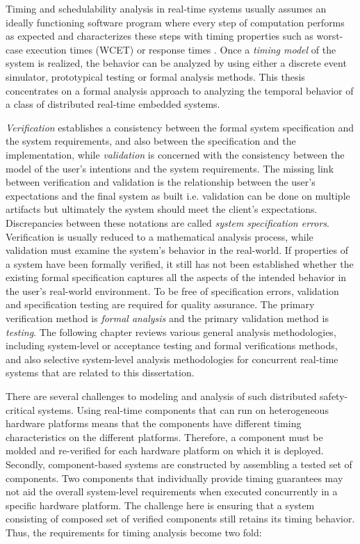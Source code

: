 Timing and schedulability analysis in real-time systems usually assumes an ideally functioning software program where every step of computation performs as expected and characterizes these steps with timing properties such as worst-case execution times (WCET) \cite{wilhelm2008worst} or response times \cite{joseph1986finding}. Once a \emph{timing model} of the system is realized, the behavior can be analyzed by using either a discrete event simulator, prototypical testing or formal analysis methods. This thesis concentrates on a formal analysis approach to analyzing the temporal behavior of a class of distributed real-time embedded systems.

\emph{Verification} establishes a consistency between the formal system specification and the system requirements, and also between the specification and the implementation, while \emph{validation} is concerned with the consistency between the model of the user's intentions and the system requirements. The missing link between verification and validation is the relationship between the user's expectations and the final system as built i.e. validation can be done on multiple artifacts but ultimately the system should meet the client's expectations. Discrepancies between these notations are called \emph{system specification errors}. Verification is usually reduced to a mathematical analysis process, while validation must examine the system's behavior in the real-world. If properties of a system have been formally verified, it still has not been established whether the existing formal specification captures all the aspects of the intended behavior in the user's real-world environment. To be free of specification errors, validation and specification testing are required for quality assurance. The primary verification method is \emph{formal analysis} and the primary validation method is \emph{testing}. The following chapter reviews various general analysis methodologies, including system-level or acceptance testing and formal verifications methods, and also selective system-level analysis methodologies for concurrent real-time systems that are related to this dissertation. 


There are several challenges to modeling and analysis of such distributed safety-critical systems. Using real-time components that can run on heterogeneous hardware platforms means that the components have different timing characteristics on the different platforms. Therefore, a component must be molded and re-verified for each hardware platform on which it is deployed. Secondly, component-based systems are constructed by assembling a tested set of components. Two components that individually provide timing guarantees may not aid the overall system-level requirements when executed concurrently in a specific hardware platform. The challenge here is ensuring that a system consisting of composed set of verified components still retains its timing behavior. Thus, the requirements for timing analysis become two fold: 

